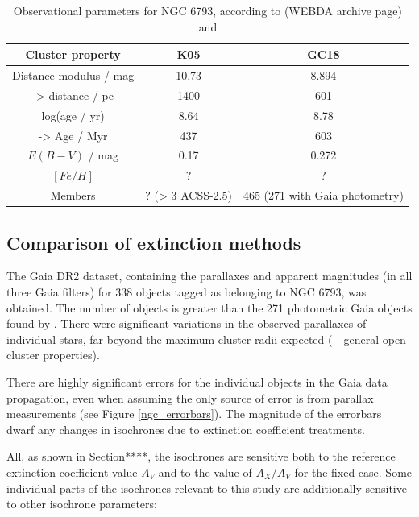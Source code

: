 \documentclass[12pt, a4paper]{report}
\begin{document}
\begin{table}
\begin{center}
\begin{tabular}{ccc}
\hline
Cluster property & K05 & GC18 \\
\hline
Distance modulus / mag & 10.73 & 8.894 \\
-> distance / pc & 1400 & 601 \\
log(age / yr) & 8.64 & 8.78 \\
-> Age / Myr & 437 & 603 \\
$E(B-V)$ / mag & 0.17 & 0.272 \\
$[Fe/H]$ & ? & ? \\
Members & ? (> 3 ACSS-2.5) & 465 (271 with Gaia photometry) \\
\hline
\end{tabular}
\caption{Observational parameters for NGC 6793, according to \cite{2005A&A...438.1163K} (WEBDA archive page) and \cite{2018A&A...616A..10G}}
\label{NGC6793_obs}
\end{center}
\end{table}

\subsection{Comparison of extinction methods}
The Gaia DR2 dataset, containing the parallaxes and apparent magnitudes (in all three Gaia filters) for 338 objects tagged as belonging to NGC 6793, was obtained. The number of objects is greater than the 271 photometric Gaia objects found by \cite{2018A&A...616A..10G}. There were significant variations in the observed parallaxes of individual stars, far beyond the maximum cluster radii expected (\cite{2006A&A...456..523S} - general open cluster properties).

There are highly significant errors for the individual objects in the Gaia data propagation, even when assuming the only source of error is from  parallax measurements (see Figure \ref{ngc_errorbars}). The magnitude of the errorbars dwarf any changes in isochrones due to extinction coefficient treatments.

All, as shown in Section****, the isochrones are sensitive both to the reference extinction coefficient value $A_{V}$ and to the value of $A_{X}/A_{V}$ for the fixed case. Some individual parts of the isochrones relevant to this study are additionally sensitive to other isochrone parameters:
\end{document}
